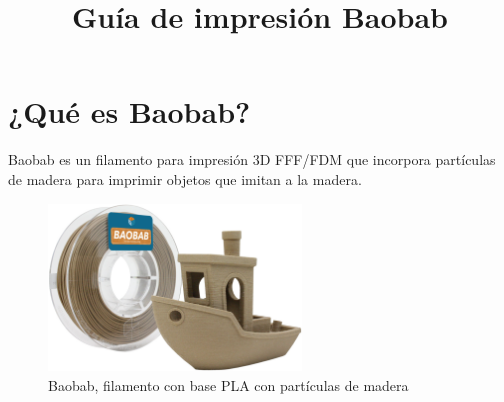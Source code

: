 \documentclass[11pt,a4paper]{article}
\title{Guía de impresión Baobab}
\date{}
\begin{document}

\section{¿Qué es Baobab?}Baobab es un filamento para impresión 3D FFF/FDM que incorpora partículas de madera para imprimir objetos que imitan a la madera. 
\begin{figure}[H]
\centering
\includegraphics[width=0.6\textwidth,cfbox=azul_marcos 4pt 0pt]{FOTOS/BAOBAB_3DBENCHY}
\caption*{Baobab, filamento con base PLA con partículas de madera}
\end{figure}
\end{document}
